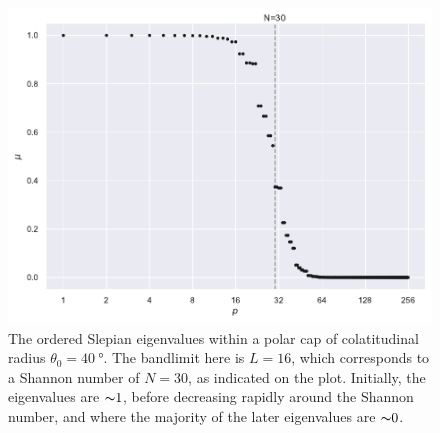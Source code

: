 \begin{figure}[htpb]
\centering\capstart{}
\includegraphics[width=\textwidth]{polar_cap_eigenvalues.pdf}
\caption[
The Slepian eigenvalues within a \(\SI{40}{\degree}\) polar cap
]{
The ordered Slepian eigenvalues within a polar cap of colatitudinal radius \(\theta_{0}=\SI{40}{\degree}\).
The bandlimit here is \(L=16\), which corresponds to a Shannon number of \(N=30\), as indicated on the plot.
Initially, the eigenvalues are \({\thicksim}\num{1}\), before decreasing rapidly around the Shannon number, and where the majority of the later eigenvalues are \({\thicksim}\num{0}\).
}\label{fig:chapter2_polar_cap_eigenvalues}
\end{figure}
